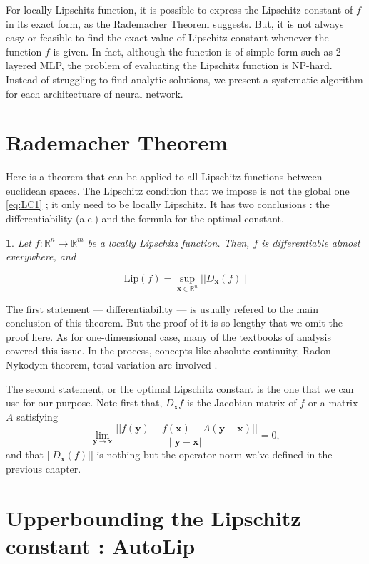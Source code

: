 \documentclass[12pt]{report}
\numberwithin{figure}{chapter}
\theoremstyle{plain}
\newtheorem{theorem}{\protect\theoremname}[chapter]
\theoremstyle{definition}
\theoremstyle{corollary}
\theoremstyle{definition}
\theoremstyle{plain}
\theoremstyle{definition}
\theoremstyle{plain}
\providecommand{\theoremname}{Theorem}
\newcommand\bx{\ensuremath{\boldsymbol x}}
\newcommand\by{\ensuremath{\boldsymbol y}}
\newcommand\lip{\ensuremath{\text{Lip}}}
\begin{document}
For locally Lipschitz function, it is possible to express the Lipschitz constant of \(f\) in its exact form, as the Rademacher Theorem suggests.
But, it is not always easy or feasible to find the exact value of Lipschitz constant whenever the function \(f\) is given.
In fact, although the function is of simple form such as 2-layered MLP, the problem of evaluating the Lipschitz function is NP-hard.
Instead of struggling to find analytic solutions, we present a systematic algorithm for each architectuare of neural network\cite{VA-SK}.

\section{Rademacher Theorem}
Here is a theorem that can be applied to all Lipschitz functions between euclidean spaces.
The Lipschitz condition that we impose is not the global one \eqref{eq:LC1} ; it only need to be locally Lipschitz.
It has two conclusions : the differentiability (a.e.) and the formula for the optimal constant.

\begin{theorem}\label{theo:Rademacher}
\cite{HF}
Let \(f:\mathbb R^n\to\mathbb R^m\) be a locally Lipschitz function.
Then,
\(f\) is differentiable almost everywhere, and
\end{theorem}
\begin{equation}
\lip(f) = \sup_{\bx\in\mathbb R^n}||D_{\bx}(f)||
\end{equation}

The first statement --- differentiability --- is usually refered to the main conclusion of this theorem.
But the proof of it is so lengthy that we omit the proof here.
As for one-dimensional case, many of the textbooks of analysis covered this issue.
In the process, concepts like absolute continuity, Radon-Nykodym theorem, total variation are involved \cite{WR}.

The second statement, or the optimal Lipschitz constant is the one that we can use for our purpose.
Note first that, \(D_{\bx}f\) is the Jacobian matrix of \(f\) or a matrix \(A\) satisfying
\[\lim_{\by\to\bx}\frac{||f(\by)-f(\bx)-A(\by-\bx)||}{||\by-\bx||}=0,\]
and that \(||D_{\bx}(f)||\) is nothing but the operator norm we've defined in the previous chapter.

\section{Upperbounding the Lipschitz constant : AutoLip}
\end{document}
